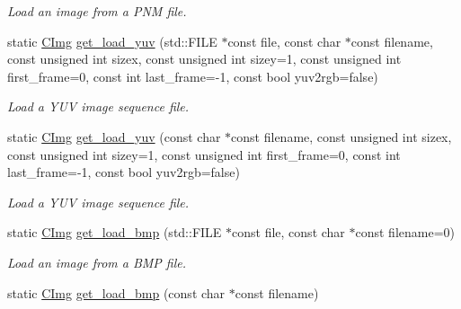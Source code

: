 \begin{DoxyCompactItemize}
\begin{DoxyCompactList}\small\item\em Load an image from a PNM file. \item\end{DoxyCompactList}\item 
\hypertarget{structcimg__library_1_1_c_img_ae186ed5d00e049a4d7e484906fa8dce5}{
static \hyperlink{structcimg__library_1_1_c_img}{CImg} \hyperlink{structcimg__library_1_1_c_img_ae186ed5d00e049a4d7e484906fa8dce5}{get\_\-load\_\-yuv} (std::FILE $\ast$const file, const char $\ast$const filename, const unsigned int sizex, const unsigned int sizey=1, const unsigned int first\_\-frame=0, const int last\_\-frame=-\/1, const bool yuv2rgb=false)}
\label{structcimg__library_1_1_c_img_ae186ed5d00e049a4d7e484906fa8dce5}

\begin{DoxyCompactList}\small\item\em Load a YUV image sequence file. \item\end{DoxyCompactList}\item 
\hypertarget{structcimg__library_1_1_c_img_a3ca8fde30784f077501255cb9424cf63}{
static \hyperlink{structcimg__library_1_1_c_img}{CImg} \hyperlink{structcimg__library_1_1_c_img_a3ca8fde30784f077501255cb9424cf63}{get\_\-load\_\-yuv} (const char $\ast$const filename, const unsigned int sizex, const unsigned int sizey=1, const unsigned int first\_\-frame=0, const int last\_\-frame=-\/1, const bool yuv2rgb=false)}
\label{structcimg__library_1_1_c_img_a3ca8fde30784f077501255cb9424cf63}

\begin{DoxyCompactList}\small\item\em Load a YUV image sequence file. \item\end{DoxyCompactList}\item 
\hypertarget{structcimg__library_1_1_c_img_ab7bee0877eb6b5e27cee3abf2ade45cf}{
static \hyperlink{structcimg__library_1_1_c_img}{CImg} \hyperlink{structcimg__library_1_1_c_img_ab7bee0877eb6b5e27cee3abf2ade45cf}{get\_\-load\_\-bmp} (std::FILE $\ast$const file, const char $\ast$const filename=0)}
\label{structcimg__library_1_1_c_img_ab7bee0877eb6b5e27cee3abf2ade45cf}

\begin{DoxyCompactList}\small\item\em Load an image from a BMP file. \item\end{DoxyCompactList}\item 
\hypertarget{structcimg__library_1_1_c_img_a30b95dca92e8488a9d2d0c5923a8247a}{
static \hyperlink{structcimg__library_1_1_c_img}{CImg} \hyperlink{structcimg__library_1_1_c_img_a30b95dca92e8488a9d2d0c5923a8247a}{get\_\-load\_\-bmp} (const char $\ast$const filename)}
\label{structcimg__library_1_1_c_img_a30b95dca92e8488a9d2d0c5923a8247a}


\end{DoxyCompactItemize}
